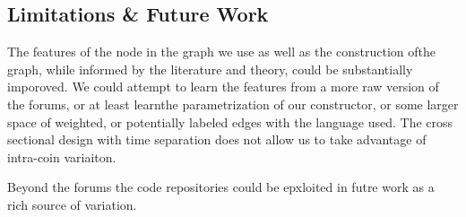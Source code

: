 \subsection{Limitations \& Future Work}

The features of the node in the graph we use as well as the construction ofthe graph, while informed by the literature and theory, could be substantially imporoved.
We could attempt to learn the features from a more raw version of the forums, or at least learnthe parametrization of our constructor, or some larger space of weighted, or potentially labeled edges with the language used.
The cross sectional design with time separation does not allow us to take advantage of intra-coin variaiton.

Beyond the forums the code repositories could be epxloited in futre work as a rich source of variation.
